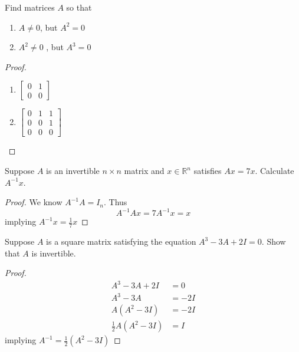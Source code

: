 \begin{exercise} \label{e1.4.18}
    Find matrices \( A \) so that
    \begin{enumerate}
        \item \( A \neq 0 \), but \( A^2 = 0 \)
        \item \( A^2 \neq 0 \) , but \( A^3 = 0 \)
    \end{enumerate}
    
    \begin{proof}
        \begin{enumerate}
            \item \( \begin{bmatrix} 0 & 1 \\ 0 & 0 \end{bmatrix} \)
            
            \item \( \begin{bmatrix} 0 & 1 & 1 \\ 0 & 0 & 1 \\ 0 & 0 & 0 \end{bmatrix} \)
        \end{enumerate}
    \end{proof}
\end{exercise} %

\begin{exercise} \label{e1.4.19}
    Suppose \( A \) is an invertible \( n \times n \) matrix and \( x \in \mathbb{R}^n \) satisfies \( Ax = 7x \). Calculate \( A^{-1}x \).
    
    \begin{proof}
        We know \( A^{-1}A = I_n \). Thus 
        \[ A^{-1}Ax = 7A^{-1}x = x \]
        implying \( A^{-1}x = \frac{1}{7}x \)
    \end{proof}
\end{exercise} %

\begin{exercise} \label{e1.4.20}
    Suppose \( A \) is a square matrix satisfying the equation \( A^3 - 3A + 2I = 0 \). Show that \( A \) is invertible.
    
    \begin{proof}
        \begin{align*}
            A^3 - 3A + 2I &= 0 \\
            A^3 - 3A &= -2I \\
            A(A^2 - 3I) &= -2I \\
            \frac{1}{2}A(A^2 - 3I) &= I
        \end{align*}
        implying \( A^{-1} = \frac{1}{2}(A^2 - 3I) \)
    \end{proof}
\end{exercise} %

